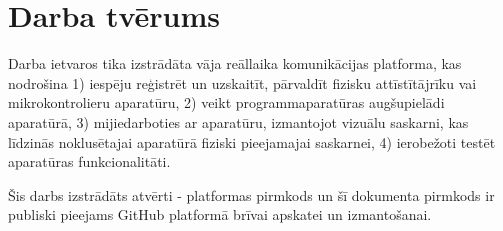 \section{Darba tvērums}

Darba ietvaros tika izstrādāta vāja reāllaika komunikācijas platforma, kas
nodrošina 1) iespēju reģistrēt un uzskaitīt, pārvaldīt fizisku attīstītājrīku
vai mikrokontrolieru aparatūru, 2) veikt programmaparatūras augšupielādi
aparatūrā, 3) mijiedarboties ar aparatūru, izmantojot vizuālu saskarni, kas
līdzinās noklusētajai aparatūrā fiziski pieejamajai saskarnei, 4) ierobežoti
testēt aparatūras funkcionalitāti.

Šis darbs izstrādāts atvērti - platformas pirmkods un šī dokumenta pirmkods ir
publiski pieejams GitHub platformā brīvai apskatei un izmantošanai.
\cite{VeinbahsKrisjanisTestbed} \cite{VeinbahsKrisjanisThesis}


  





